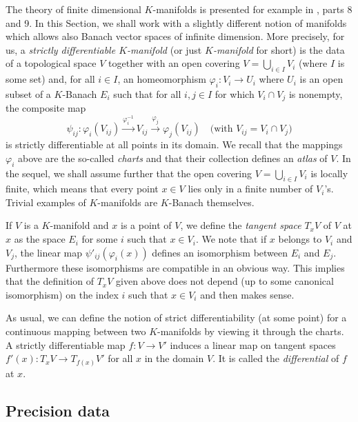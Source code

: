 \documentclass{amsart}
\begin{document}
The theory of finite dimensional $K$-manifolds is presented for example 
in \cite{Schneider}, parts 8 and 9. In this Section, we shall work with
a slightly different notion of manifolds which allows also Banach vector 
spaces of infinite dimension.
More precisely, for us, a \emph{strictly differentiable $K$-manifold} 
(or just \emph{$K$-manifold} for short) is the data of a topological 
space $V$ together with an open covering $V = \bigcup_{i \in I} V_i$ 
(where $I$ is some set) and, for all $i \in I$, an homeomorphism 
$\varphi_i : V_i \to U_i$ where $U_i$ is an open subset of a $K$-Banach 
$E_i$ such that for all $i,j \in I$ for which $V_i \cap V_j$ is 
nonempty, the composite map
\begin{equation}
\label{eq:psiij}
\psi_{ij} : 
\varphi_i(V_{ij}) \stackrel{\varphi_i^{-1}}{\longrightarrow} 
V_{ij} \stackrel{\varphi_j}{\longrightarrow} \varphi_j(V_{ij})
\quad \text{(with } V_{ij} = V_i \cap V_j \text{)}
\end{equation}
is strictly differentiable at all points in its domain. We recall that
the mappings $\varphi_i$ above are the so-called \emph{charts} and that
their collection defines an \emph{atlas} of $V$. In the sequel, we shall
assume further that the open covering $V = \bigcup_{i \in I} V_i$ is
locally finite, which means that every point $x \in V$ lies only in a
finite number of $V_i$'s. Trivial examples of $K$-manifolds are 
$K$-Banach themselves.

If $V$ is a $K$-manifold and $x$ is a point of $V$, we define the 
\emph{tangent space} $T_x V$ of $V$ at $x$ as the space $E_i$ for some 
$i$ such that $x \in V_i$. We note that if $x$ belongs to $V_i$ and 
$V_j$, the linear map $\psi'_{ij}(\varphi_i(x))$ defines an isomorphism 
between $E_i$ and $E_j$. Furthermore these isomorphisms are compatible 
in an obvious way. This implies that the definition of $T_x V$ given 
above does not depend (up to some canonical isomorphism) on the index 
$i$ such that $x \in V_i$ and then makes sense.

As usual, we can define the notion of strict differentiability (at some 
point) for a continuous mapping between two $K$-manifolds by viewing it 
through the charts. A strictly differentiable map $f : V \to V'$ induces 
a linear map on tangent spaces $f'(x) : T_x V \to T_{f(x)} V'$ for all 
$x$ in the domain $V$. It is called the \emph{differential} of $f$ at
$x$.

\subsection{Precision data}
\end{document}

